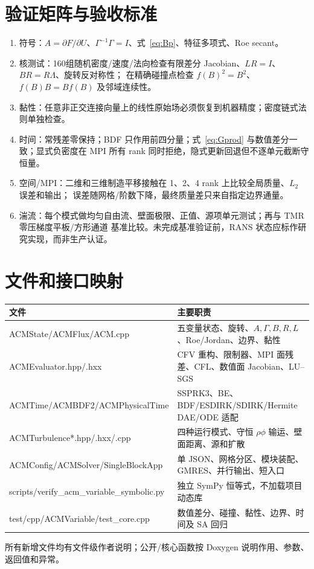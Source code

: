 \documentclass[UTF8,11pt,a4paper]{ctexart}
\begin{document}
\section{验证矩阵与验收标准}
\begin{enumerate}
\item 符号：$A=\partial F/\partial U$、$\Gamma^{-1}\Gamma=I$、式~\eqref{eq:Bp}、特征多项式、Roe secant。
\item 核测试：160组随机密度/速度/法向检查有限差分 Jacobian、$LR=I$、$BR=R\Lambda$、旋转反对称性；
在精确碰撞点检查 $f(B)^2=B^2$、$f(B)B=Bf(B)$ 及邻域连续性。
\item 黏性：任意非正交连接向量上的线性原始场必须恢复到机器精度；密度链式法则单独检查。
\item 时间：常残差零保持；BDF 只作用前四分量；式~\eqref{eq:Gprod} 与数值差分一致；显式负密度在
MPI 所有 rank 同时拒绝，隐式更新回退但不逐单元截断守恒量。
\item 空间/MPI：二维和三维制造平移接触在 1、2、4 rank 上比较全局质量、$L_2$ 误差和输出；
误差随网格/阶数下降，最终质量差只来自指定边界通量。
\item 湍流：每个模式做均匀自由流、壁面极限、正值、源项单元测试；再与 TMR 零压梯度平板/方形通道
基准比较。未完成基准验证前，RANS 状态应标作研究实现，而非生产认证。
\end{enumerate}

\section{文件和接口映射}
\begin{longtable}{p{.29\linewidth}p{.63\linewidth}}
\toprule 文件&主要职责\\\midrule
ACMState/ACMFlux/ACM.cpp&五变量状态、旋转、$A,\Gamma,B,R,L$、Roe/Jordan、边界、黏性\\
ACMEvaluator.hpp/.hxx&CFV 重构、限制器、MPI 面残差、CFL、数值面 Jacobian、LU--SGS\\
ACMTime/ACMBDF2/ACMPhysicalTime&SSPRK3、BE、BDF/ESDIRK/SDIRK/Hermite DAE/ODE 适配\\
ACMTurbulence*.hpp/.hxx/.cpp&四种运行模式、守恒 $\rho\phi$ 输运、壁面距离、源和扩散\\
ACMConfig/ACMSolver/SingleBlockApp&单 JSON、网格分区、模块装配、GMRES、并行输出、短入口\\
scripts/verify\_acm\_variable\_symbolic.py&独立 SymPy 恒等式，不加载项目动态库\\
test/cpp/ACMVariable/test\_core.cpp&数值差分、碰撞、黏性、边界、时间及 SA 回归\\
\bottomrule
\end{longtable}
所有新增文件均有文件级作者说明；公开/核心函数按 Doxygen 说明作用、参数、返回值和异常。
\end{document}
